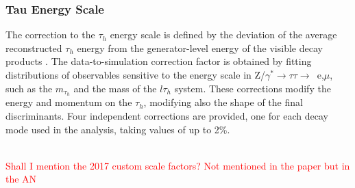 \documentclass[../main.tex]{subfiles}
\begin{document}
\subsubsection*{Tau Energy Scale}

The correction to the $\tau_h$ energy scale is defined by the deviation of the average reconstructed $\tau_h$ energy from the generator-level energy of the visible \tauh{} decay products \cite{tau_performance_2018, tau_performance_2022}. The data-to-simulation correction factor is obtained by fitting distributions of observables sensitive to the energy scale in Z/$\gamma^*\to\tau\tau\to$~e\tauh,$\mu$\tauh{}, such as the $m_{\tau_h}$ and the mass of the $l\tau_h$ system. These corrections modify the energy and momentum on the $\tau_h$, modifying also the shape of the final discriminants. Four independent corrections are provided, one for each decay mode used in the analysis, taking values of up to 2\%. 

~\\

\textcolor{red}{Shall I mention the 2017 custom scale factors? Not mentioned in the paper but in the AN}
\end{document}
